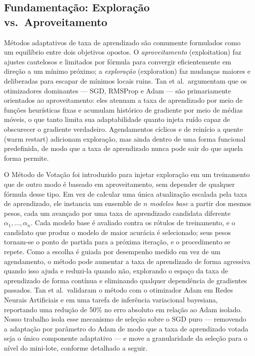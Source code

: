\documentclass[conference]{IEEEtran}
\begin{document}
\subsection{Fundamentação: Exploração vs.\ Aproveitamento}

Métodos adaptativos de taxa de aprendizado são comumente formulados como um equilíbrio entre dois objetivos opostos. O \emph{aproveitamento} (exploitation) faz ajustes cautelosos e limitados por fórmula para convergir eficientemente em direção a um mínimo próximo; a \emph{exploração} (exploration) faz mudanças maiores e deliberadas para escapar de mínimos locais ruins. Tan et al.\ argumentam que os otimizadores dominantes --- SGD, RMSProp e Adam --- são primariamente orientados ao aproveitamento: eles atenuam a taxa de aprendizado por meio de funções heurísticas fixas e acumulam histórico de gradiente por meio de médias móveis, o que tanto limita sua adaptabilidade quanto injeta ruído capaz de obscurecer o gradiente verdadeiro. Agendamentos cíclicos e de reinício a quente (warm restart) adicionam exploração, mas ainda dentro de uma forma funcional predefinida, de modo que a taxa de aprendizado nunca pode sair do que aquela forma permite.

O Método de Votação foi introduzido para injetar exploração em um treinamento que de outro modo é baseado em aproveitamento, sem depender de qualquer fórmula desse tipo. Em vez de calcular uma única atualização escalada pela taxa de aprendizado, ele instancia um ensemble de $n$ \emph{modelos base} a partir dos mesmos pesos, cada um avançado por uma taxa de aprendizado candidata diferente $\alpha_1, \ldots, \alpha_n$. Cada modelo base é avaliado contra os rótulos de treinamento, e o candidato que produz o modelo de maior acurácia é selecionado; seus pesos tornam-se o ponto de partida para a próxima iteração, e o procedimento se repete. Como a escolha é guiada por desempenho medido em vez de um agendamento, o método pode aumentar a taxa de aprendizado de forma agressiva quando isso ajuda e reduzi-la quando não, explorando o espaço da taxa de aprendizado de forma contínua e eliminando qualquer dependência de gradientes passados. Tan et al.\ validaram o método com o otimizador Adam em Redes Neurais Artificiais e em uma tarefa de inferência variacional bayesiana, reportando uma redução de 50\% no erro absoluto em relação ao Adam isolado. Nosso trabalho isola esse mecanismo de seleção sobre o SGD puro --- removendo a adaptação por parâmetro do Adam de modo que a taxa de aprendizado votada seja o único componente adaptativo --- e move a granularidade da seleção para o nível do mini-lote, conforme detalhado a seguir.
\end{document}
